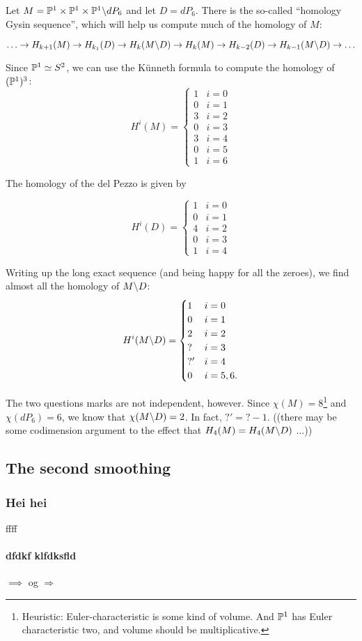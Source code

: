 \documentclass[11pt, english]{article}
\begin{document}
Let $M = \mathbb{P}^1 \times \mathbb{P}^1 \times \mathbb{P}^1 \backslash dP_6$ and let $D=dP_6$. There is the so-called ``homology Gysin sequence'', which will help us compute much of the homology of $M$:

\[
\ldots \to H_{k+1}(M) \to H_{k_1}(D) \to H_k(M \backslash D) \to H_k(M) \to H_{k-2}(D) \to H_{k-1}(M \backslash D) \to \ldots 
\]

Since $\mathbb{P}^1 \simeq S^2$, we can use the Künneth formula to compute the homology of $(\mathbb{P}^1)^3$: 
\[
H^i(M) = \begin{cases}
1 & i = 0 \\
0 & i = 1 \\
3 & i = 2 \\
0 & i = 3 \\
3 & i = 4 \\
0 & i = 5 \\
1 & i = 6
\end{cases}
\]

The homology of the del Pezzo is given by 

\[
H^i(D) = \begin{cases}
1 & i = 0 \\
0 & i = 1 \\
4 & i = 2 \\
0 & i = 3 \\
1 & i = 4
\end{cases}
\]

Writing up the long exact sequence (and being happy for all the zeroes), we find almost all the homology of $M \backslash D$:
\[
H^i(M \backslash D) = \begin{cases}
1 & i = 0 \\
0 & i = 1 \\
2 & i = 2 \\
? & i = 3 \\
?' & i = 4 \\
0 & i = 5,6.
\end{cases}
\]

The two questions marks are not independent, however. Since $\chi(M) = 8$\footnote{Heuristic: Euler-characteristic is some kind of volume. And $\mathbb{P}^1$ has Euler characteristic two, and volume should be multiplicative.} and $\chi(dP_6)=6$, we know that $\chi(M \backslash D) = 2$. In fact, $?'=?-1$. ((there may be some codimension argument to the effect that $H_4(M) = H_4(M \backslash D)$ ...))

\subsection{The second smoothing}

\subsubsection{Hei hei}

ffff

\paragraph{dfdkf klfdksfld }

$\implies$
og 
$\Rightarrow$ 
\end{document}
